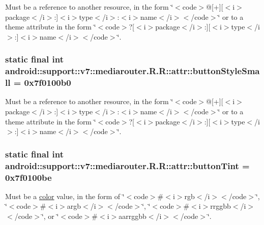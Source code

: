 Must be a reference to another resource, in the form \char`\"{}$<$code$>$@\mbox{[}+\mbox{]}\mbox{[}$<$i$>$package$<$/i$>$:\mbox{]}$<$i$>$type$<$/i$>$:$<$i$>$name$<$/i$>$$<$/code$>$\char`\"{} or to a theme attribute in the form \char`\"{}$<$code$>$?\mbox{[}$<$i$>$package$<$/i$>$:\mbox{]}\mbox{[}$<$i$>$type$<$/i$>$:\mbox{]}$<$i$>$name$<$/i$>$$<$/code$>$\char`\"{}. \hypertarget{classandroid_1_1support_1_1v7_1_1mediarouter_1_1_r_1_1attr_1b5719ec65c21c2710a1a0b599a54578}{
\subsubsection[{buttonStyleSmall}]{\setlength{\rightskip}{0pt plus 5cm}static final int android::support::v7::mediarouter.R.R::attr::buttonStyleSmall = 0x7f0100b0}}
\label{classandroid_1_1support_1_1v7_1_1mediarouter_1_1_r_1_1attr_1b5719ec65c21c2710a1a0b599a54578}


Must be a reference to another resource, in the form \char`\"{}$<$code$>$@\mbox{[}+\mbox{]}\mbox{[}$<$i$>$package$<$/i$>$:\mbox{]}$<$i$>$type$<$/i$>$:$<$i$>$name$<$/i$>$$<$/code$>$\char`\"{} or to a theme attribute in the form \char`\"{}$<$code$>$?\mbox{[}$<$i$>$package$<$/i$>$:\mbox{]}\mbox{[}$<$i$>$type$<$/i$>$:\mbox{]}$<$i$>$name$<$/i$>$$<$/code$>$\char`\"{}. \hypertarget{classandroid_1_1support_1_1v7_1_1mediarouter_1_1_r_1_1attr_b496eccd10aa55381eb4a0dfd59beb0f}{
\subsubsection[{buttonTint}]{\setlength{\rightskip}{0pt plus 5cm}static final int android::support::v7::mediarouter.R.R::attr::buttonTint = 0x7f0100be}}
\label{classandroid_1_1support_1_1v7_1_1mediarouter_1_1_r_1_1attr_b496eccd10aa55381eb4a0dfd59beb0f}


Must be a \hyperlink{classandroid_1_1support_1_1v7_1_1mediarouter_1_1_r_1_1color}{color} value, in the form of \char`\"{}$<$code$>$\#$<$i$>$rgb$<$/i$>$$<$/code$>$\char`\"{}, \char`\"{}$<$code$>$\#$<$i$>$argb$<$/i$>$$<$/code$>$\char`\"{}, \char`\"{}$<$code$>$\#$<$i$>$rrggbb$<$/i$>$$<$/code$>$\char`\"{}, or \char`\"{}$<$code$>$\#$<$i$>$aarrggbb$<$/i$>$$<$/code$>$\char`\"{}. 

